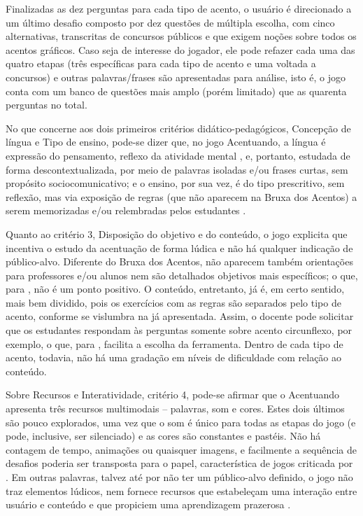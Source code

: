\documentclass{textolivre}
\begin{document}
Finalizadas as dez perguntas para cada tipo de acento, o usuário é direcionado a um último desafio composto por dez questões de múltipla escolha, com cinco alternativas, transcritas de concursos públicos e que exigem noções sobre todos os acentos gráficos. Caso seja de interesse do jogador, ele pode refazer cada uma das quatro etapas (três específicas para cada tipo de acento e uma voltada a concursos) e outras palavras/frases são apresentadas para análise, isto é, o jogo conta com um banco de questões mais amplo (porém limitado) que as quarenta perguntas no total.

No que concerne aos dois primeiros critérios didático-pedagógicos, Concepção de língua e Tipo de ensino, pode-se dizer que, no jogo Acentuando, a língua é expressão do pensamento, reflexo da atividade mental \cite{costa_val1996, couto2020}, e, portanto, estudada de forma descontextualizada, por meio de palavras isoladas e/ou frases curtas, sem propósito sociocomunicativo; e o ensino, por sua vez, é do tipo prescritivo, sem reflexão, mas via exposição de regras (que não aparecem na Bruxa dos Acentos) a serem memorizadas e/ou relembradas pelos estudantes \cite{ribeiro2013, ribeiro2009}.

Quanto ao critério 3, Disposição do objetivo e do conteúdo, o jogo explicita que incentiva o estudo da acentuação de forma lúdica e não há qualquer indicação de público-alvo. Diferente do Bruxa dos Acentos, não aparecem também orientações para professores e/ou alunos nem são detalhados objetivos mais específicos; o que, para \textcite{ribeiro2013}, não é um ponto positivo. O conteúdo, entretanto, já é, em certo sentido, mais bem dividido, pois os exercícios com as regras são separados pelo tipo de acento, conforme se vislumbra na  já apresentada. Assim, o docente pode solicitar que os estudantes respondam às perguntas somente sobre acento circunflexo, por exemplo, o que, para \textcite{ribeiro2013}, facilita a escolha da ferramenta. Dentro de cada tipo de acento, todavia, não há uma gradação em níveis de dificuldade com relação ao conteúdo.

Sobre Recursos e Interatividade, critério 4, pode-se afirmar que o Acentuando apresenta três recursos multimodais – palavras, som e cores. Estes dois últimos são pouco explorados, uma vez que o som é único para todas as etapas do jogo (e pode, inclusive, ser silenciado) e as cores são constantes e pastéis. Não há contagem de tempo, animações ou quaisquer imagens, e facilmente a sequência de desafios poderia ser transposta para o papel, característica de jogos criticada por \textcite{ribeiro2009}. Em outras palavras, talvez até por não ter um público-alvo definido, o jogo não traz elementos lúdicos, nem fornece recursos que estabeleçam uma interação entre usuário e conteúdo e que propiciem uma aprendizagem prazerosa \cite{ribeiro2013}.
\end{document}
